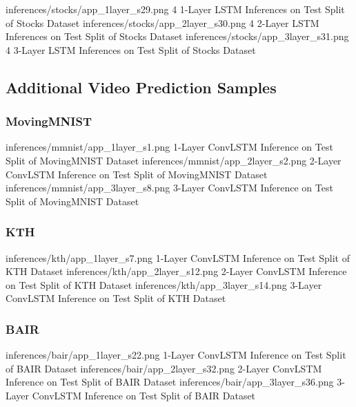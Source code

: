 \documentclass{scrartcl}
\begin{document}
\threefig
{inferences/stocks/app_1layer_s29.png}
{4 1-Layer LSTM Inferences on Test Split of Stocks Dataset}
{inferences/stocks/app_2layer_s30.png}
{4 2-Layer LSTM Inferences on Test Split of Stocks Dataset}
{inferences/stocks/app_3layer_s31.png}
{4 3-Layer LSTM Inferences on Test Split of Stocks Dataset}

\newpage
\subsection{Additional Video Prediction Samples}
\label{subsec:additional_video_inferences}

\subsubsection{MovingMNIST}
\label{subsubsec:additional_mmnist_inferences}

\threefig
{inferences/mmnist/app_1layer_s1.png}
{1-Layer ConvLSTM Inference on Test Split of MovingMNIST Dataset}
{inferences/mmnist/app_2layer_s2.png}
{2-Layer ConvLSTM Inference on Test Split of MovingMNIST Dataset}
{inferences/mmnist/app_3layer_s8.png}
{3-Layer ConvLSTM Inference on Test Split of MovingMNIST Dataset}

\subsubsection{KTH}
\label{subsubsec:additional_kth_inferences}

\threefig
{inferences/kth/app_1layer_s7.png}
{1-Layer ConvLSTM Inference on Test Split of KTH Dataset}
{inferences/kth/app_2layer_s12.png}
{2-Layer ConvLSTM Inference on Test Split of KTH Dataset}
{inferences/kth/app_3layer_s14.png}
{3-Layer ConvLSTM Inference on Test Split of KTH Dataset}

\subsubsection{BAIR}
\label{subsubsec:additional_bair_inferences}

\threefig
{inferences/bair/app_1layer_s22.png}
{1-Layer ConvLSTM Inference on Test Split of BAIR Dataset}
{inferences/bair/app_2layer_s32.png}
{2-Layer ConvLSTM Inference on Test Split of BAIR Dataset}
{inferences/bair/app_3layer_s36.png}
{3-Layer ConvLSTM Inference on Test Split of BAIR Dataset}
\end{document}
